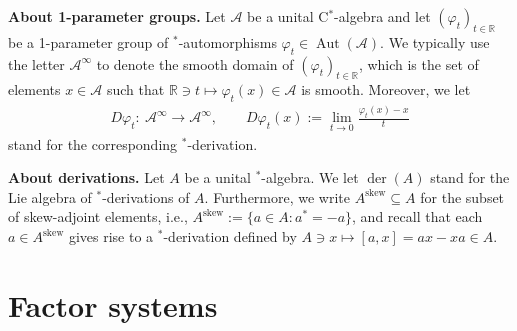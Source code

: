 \documentclass[pdftex]{sigma}
\numberwithin{equation}{section}
\newcommand*{\R}{\mathbb R}		%
\DeclareMathOperator{\Aut}{Aut}
\DeclareMathOperator{\der}{der}
\newcommand*{\Star}{$^*$\nobreakdash}
\newcommand*{\alg}{\mathcal}		%
\newcommand*{\aA}{\alg{A}}			%
\begin{document}
{\bf About 1-parameter groups.}
Let $\aA$ be a unital C\Star-algebra and let $(\varphi_t)_{t \in \R}$ be a 1\nobreakdash-parameter group of \Star-automorphisms $\varphi_t \in \Aut(\aA)$.
We typically use the letter $\aA^\infty$ to denote the smooth domain of $(\varphi_t)_{t \in \R}$, which is the set of elements $x \in \aA$ such that $\R \ni t \mapsto \varphi_t(x) \in \aA$ is smooth.
Moreover, we let
\begin{gather*}
	D \varphi_t \colon \ \aA^\infty \to \aA^\infty,
	\qquad
	D \varphi_t(x) := \lim_{t \to 0} \frac{\varphi_t(x)-x}{t}
\end{gather*}
stand for the corresponding \Star-derivation.

{\bf About derivations.}
Let $A$ be a unital \Star-algebra.
We let $\der(A)$ stand for the Lie algebra of \Star-derivations of $A$.
Furthermore, we write $A^\text{skew} \subseteq A$ for the subset of skew-adjoint elements, i.e., $A^{\text{skew}} := \{a \in A\colon a^* = -a \}$, and recall that each $a \in A^\text{skew}$ gives rise to a \Star-derivation defined by $A \ni x \mapsto [a,x] = ax -xa \in A$.

\section{Factor systems}\label{sec:facsys}
\end{document}
